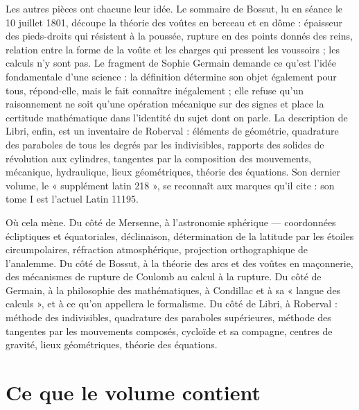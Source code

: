 \documentclass[11pt,a4paper]{article}
\begin{document}
\begin{resume}
Les autres pièces ont chacune leur idée. Le sommaire de Bossut, lu en
séance le 10 juillet 1801, découpe la théorie des voûtes en berceau et en
dôme : épaisseur des pieds-droits qui résistent à la poussée, rupture en des
points donnés des reins, relation entre la forme de la voûte et les charges
qui pressent les voussoirs ; les calculs n'y sont pas. Le fragment de Sophie
Germain demande ce qu'est l'idée fondamentale d'une science : la définition
détermine son objet également pour tous, répond-elle, mais le fait connaître
inégalement ; elle refuse qu'un raisonnement ne soit qu'une opération
mécanique sur des signes et place la certitude mathématique dans l'identité
du sujet dont on parle. La description de Libri, enfin, est un inventaire de
Roberval : éléments de géométrie, quadrature des paraboles de tous les degrés
par les indivisibles, rapports des solides de révolution aux cylindres,
tangentes par la composition des mouvements, mécanique, hydraulique, lieux
géométriques, théorie des équations. Son dernier volume, le « supplément
latin 218 », se reconnaît aux marques qu'il cite : son tome I est
l'actuel Latin 11195.

Où cela mène. Du côté de Mersenne, à l'astronomie sphérique — coordonnées
écliptiques et équatoriales, déclinaison, détermination de la latitude par
les étoiles circumpolaires, réfraction atmosphérique, projection orthographique
de l'analemme. Du côté de Bossut, à la théorie des arcs et des voûtes en
maçonnerie, des mécanismes de rupture de Coulomb au calcul à la rupture. Du
côté de Germain, à la philosophie des mathématiques, à Condillac et à sa
« langue des calculs », et à ce qu'on appellera le formalisme. Du côté de
Libri, à Roberval : méthode des indivisibles, quadrature des paraboles
supérieures, méthode des tangentes par les mouvements composés, cycloïde et
sa compagne, centres de gravité, lieux géométriques, théorie des équations.

\end{resume}

\section*{Ce que le volume contient}
\end{document}
